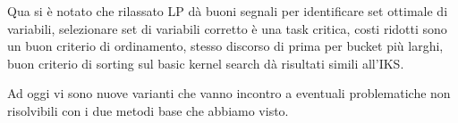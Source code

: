 Qua si è notato che rilassato LP dà buoni segnali per identificare set ottimale di variabili, selezionare set di variabili corretto è una task critica, costi ridotti sono un buon criterio di ordinamento, stesso discorso di prima per bucket più larghi, buon criterio di sorting sul basic kernel search dà risultati simili all'IKS.

Ad oggi vi sono nuove varianti che vanno incontro a eventuali problematiche non risolvibili con i due metodi base che abbiamo visto.
